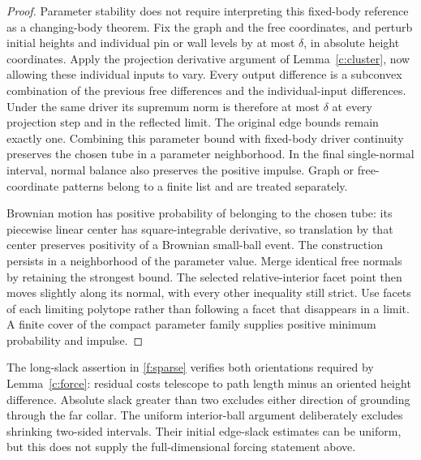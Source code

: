 \begin{proof}
Parameter stability does not require interpreting this fixed-body
reference as a changing-body theorem. Fix the graph and the free
coordinates, and perturb initial heights and individual pin or wall
levels by at most $\delta$, in absolute height coordinates. Apply the
projection derivative argument of Lemma~\ref{c:cluster}, now allowing
these individual inputs to vary. Every output difference is a
subconvex combination of the previous free differences and the
individual-input differences. Under the same driver its supremum
norm is therefore at most $\delta$ at every projection step and in
the reflected limit. The original edge bounds remain exactly one.
Combining this parameter bound with fixed-body driver continuity
preserves the chosen tube in a parameter neighborhood. In the final
single-normal interval, normal balance also preserves the positive
impulse. Graph or free-coordinate patterns belong to a finite list
and are treated separately.

Brownian motion has positive probability of belonging to the chosen
tube: its piecewise linear center has square-integrable derivative,
so translation by that center preserves positivity of a Brownian
small-ball event. The construction persists in a neighborhood of
the parameter value. Merge identical free normals by retaining the
strongest bound. The selected relative-interior facet point then
moves slightly along its normal, with every other inequality still
strict. Use facets of each limiting polytope rather than following
a facet that disappears in a limit. A finite cover of the compact
parameter family supplies positive minimum probability and impulse.
\end{proof}

The long-slack assertion in \ref{f:sparse} verifies both orientations
required by Lemma~\ref{c:force}: residual costs telescope to path length
minus an oriented height difference. Absolute slack greater than two
excludes either direction of grounding through the far collar.
The uniform interior-ball argument deliberately excludes shrinking
two-sided intervals. Their initial edge-slack estimates can be uniform,
but this does not supply the full-dimensional forcing statement above.

